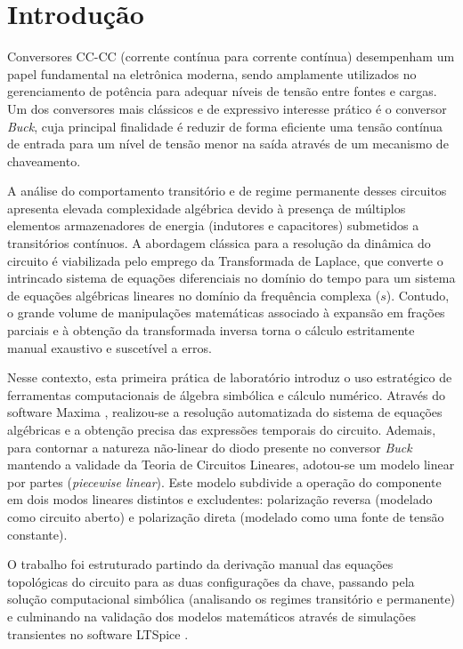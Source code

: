 \chapter{Introdução}

Conversores CC-CC (corrente contínua para corrente contínua) desempenham um papel fundamental na eletrônica moderna, sendo amplamente utilizados no gerenciamento de potência para adequar níveis de tensão entre fontes e cargas. Um dos conversores mais clássicos e de expressivo interesse prático é o conversor \textit{Buck}, cuja principal finalidade é reduzir de forma eficiente uma tensão contínua de entrada para um nível de tensão menor na saída através de um mecanismo de chaveamento.

A análise do comportamento transitório e de regime permanente desses circuitos apresenta elevada complexidade algébrica devido à presença de múltiplos elementos armazenadores de energia (indutores e capacitores) submetidos a transitórios contínuos. A abordagem clássica para a resolução da dinâmica do circuito é viabilizada pelo emprego da Transformada de Laplace, que converte o intrincado sistema de equações diferenciais no domínio do tempo para um sistema de equações algébricas lineares no domínio da frequência complexa ($s$). Contudo, o grande volume de manipulações matemáticas associado à expansão em frações parciais e à obtenção da transformada inversa torna o cálculo estritamente manual exaustivo e suscetível a erros.

Nesse contexto, esta primeira prática de laboratório introduz o uso estratégico de ferramentas computacionais de álgebra simbólica e cálculo numérico. Através do software Maxima \cite{maxima}, realizou-se a resolução automatizada do sistema de equações algébricas e a obtenção precisa das expressões temporais do circuito. Ademais, para contornar a natureza não-linear do diodo presente no conversor \textit{Buck} mantendo a validade da Teoria de Circuitos Lineares, adotou-se um modelo linear por partes (\textit{piecewise linear}). Este modelo subdivide a operação do componente em dois modos lineares distintos e excludentes: polarização reversa (modelado como circuito aberto) e polarização direta (modelado como uma fonte de tensão constante).

O trabalho foi estruturado partindo da derivação manual das equações topológicas do circuito para as duas configurações da chave, passando pela solução computacional simbólica (analisando os regimes transitório e permanente) e culminando na validação dos modelos matemáticos através de simulações transientes no software LTSpice \cite{ltspice}.

